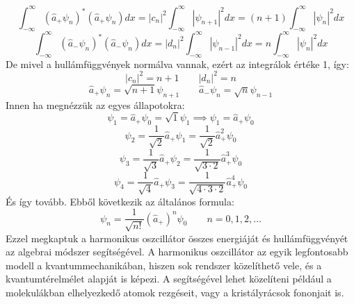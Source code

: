\documentclass[a4paper,12pt]{article}
\begin{document}
\begin{equation}
    \int_{-\infty}^{\infty} (\hat{a}_+ \psi_n)^* (\hat{a}_+ \psi_n) dx = |c_n|^2 \int_{-\infty}^{\infty} |\psi_{n+1}|^2 dx = (n + 1) \int_{-\infty}^{\infty} |\psi_n|^2 dx
\end{equation}
\begin{equation}
    \int_{-\infty}^{\infty} (\hat{a}_- \psi_n)^* (\hat{a}_- \psi_n) dx = |d_n|^2 \int_{-\infty}^{\infty} |\psi_{n-1}|^2 dx = n \int_{-\infty}^{\infty} |\psi_n|^2 dx
\end{equation}
De mivel a hullámfüggvények normálva vannak, ezért az integrálok értéke 1, így:
\begin{equation}
    |c_n|^2 = n + 1 \quad \quad |d_n|^2 = n
\end{equation}
\begin{equation}
    \hat{a}_+ \psi_n = \sqrt{n + 1} \psi_{n+1} \quad \quad \hat{a}_- \psi_n = \sqrt{n} \psi_{n-1}
\end{equation}
Innen ha megnézzük az egyes állapotokra:
\begin{equation}
    \psi_1 = \hat{a}_+ \psi_0 = \sqrt{1} \psi_1 \implies \psi_1 = \hat{a}_+ \psi_0
\end{equation}
\begin{equation}
    \psi_2 = \frac{1}{\sqrt{2}} \hat{a}_+ \psi_1 = \frac{1}{\sqrt{2}} \hat{a}_+^2 \psi_0
\end{equation}
\begin{equation}
    \psi_3 = \frac{1}{\sqrt{3}} \hat{a}_+ \psi_2 = \frac{1}{\sqrt{3 \cdot 2}} \hat{a}_+^3 \psi_0
\end{equation}
\begin{equation}
    \psi_4 = \frac{1}{\sqrt{4}} \hat{a}_+ \psi_3 = \frac{1}{\sqrt{4 \cdot 3 \cdot 2}} \hat{a}_+^4 \psi_0
\end{equation}
És így tovább. Ebből következik az általános formula:
\begin{equation}
    \psi_n = \frac{1}{\sqrt{n!}} (\hat{a}_+)^n \psi_0 \quad \quad n = 0, 1, 2, \ldots
\end{equation}
Ezzel megkaptuk a harmonikus oszcillátor összes energiáját és hullámfüggvényét az algebrai módszer segítségével. A harmonikus oszcillátor
az egyik legfontosabb modell a kvantummechanikában, hiszen sok rendszer közelíthető vele, és a kvantumtérelmélet alapját is képezi. A segítségével
lehet közelíteni például a molekulákban elhelyezkedő atomok rezgéseit, vagy a kristályrácsok fononjait is.
\end{document}
